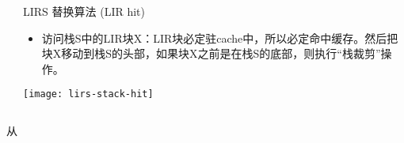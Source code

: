 \begin{frame}[plain]
	\frametitle{ }
	\begin{columns}
		\begin{column}{.1\textwidth}
			\centering
			
		\end{column}
		
		\begin{column}{.9\textwidth}
			LIRS 替换算法 (LIR hit)
			
			\begin{itemize}
				\item 访问栈S中的LIR块X：LIR块必定驻cache中，所以必定命中缓存。然后把块X移动到栈S的头部，如果块X之前是在栈S的底部，则执行“栈裁剪”操作。
				
%				
			
				
				
			\end{itemize}
			\centering
             \texttt{[image: lirs-stack-hit]}
			
		\end{column}
		
		
	\end{columns}
从\end{frame}


